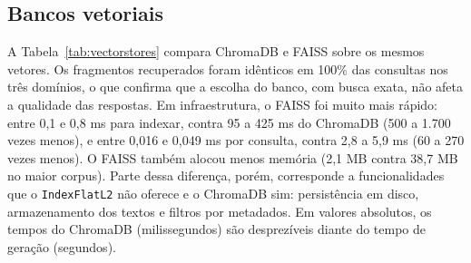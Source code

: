\subsection{Bancos vetoriais}
\label{ssc:vectorstores}

A Tabela~\ref{tab:vectorstores} compara ChromaDB e FAISS sobre os mesmos vetores. Os fragmentos recuperados foram idênticos em 100\% das consultas nos três domínios, o que confirma que a escolha do banco, com busca exata, não afeta a qualidade das respostas. Em infraestrutura, o FAISS foi muito mais rápido: entre 0,1 e 0,8 ms para indexar, contra 95 a 425 ms do ChromaDB (500 a 1.700 vezes menos), e entre 0,016 e 0,049 ms por consulta, contra 2,8 a 5,9 ms (60 a 270 vezes menos). O FAISS também alocou menos memória (2,1 MB contra 38,7 MB no maior corpus). Parte dessa diferença, porém, corresponde a funcionalidades que o \texttt{IndexFlatL2} não oferece e o ChromaDB sim: persistência em disco, armazenamento dos textos e filtros por metadados. Em valores absolutos, os tempos do ChromaDB (milissegundos) são desprezíveis diante do tempo de geração (segundos).

